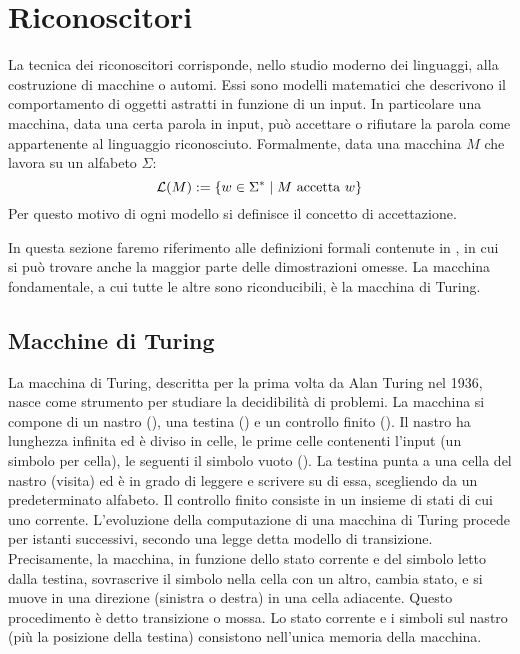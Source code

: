 \section{Riconoscitori}
La tecnica dei riconoscitori corrisponde, nello studio moderno dei linguaggi, alla costruzione di macchine o automi. Essi sono modelli matematici che descrivono il comportamento di oggetti astratti in funzione di un input. In particolare una macchina, data una certa parola in input, può accettare o rifiutare la parola come appartenente al linguaggio riconosciuto. Formalmente, data una macchina $M$ che lavora su un alfabeto $\Sigma$:
\begin{equation*}
	\mathcal L(M) := \left\{ w\in\Sigma^*\mid M\text{ accetta }w \right\}
\end{equation*}
Per questo motivo di ogni modello si definisce il concetto di accettazione.

In questa sezione faremo riferimento alle definizioni formali contenute in \cite{Hopcroft:01:introLFA2}, in cui si può trovare anche la maggior parte delle dimostrazioni omesse. La macchina fondamentale, a cui tutte le altre sono riconducibili, è la macchina di Turing.


\subsection{Macchine di Turing}
La macchina di Turing, descritta per la prima volta da Alan Turing nel 1936, nasce come strumento per studiare la decidibilità di problemi. La macchina si compone di un nastro (), una testina () e un controllo finito (). Il nastro ha lunghezza infinita ed è diviso in celle, le prime celle contenenti l'input (un simbolo per cella), le seguenti il simbolo vuoto (). La testina punta a una cella del nastro (visita) ed è in grado di leggere e scrivere su di essa, scegliendo da un predeterminato alfabeto. Il controllo finito consiste in un insieme di stati di cui uno corrente. L'evoluzione della computazione di una macchina di Turing procede per istanti successivi, secondo una legge detta modello di transizione. Precisamente, la macchina, in funzione dello stato corrente e del simbolo letto dalla testina, sovrascrive il simbolo nella cella con un altro, cambia stato, e si muove in una direzione (sinistra o destra) in una cella adiacente. Questo procedimento è detto transizione o mossa. Lo stato corrente e i simboli sul nastro (più la posizione della testina) consistono nell'unica memoria della macchina.

